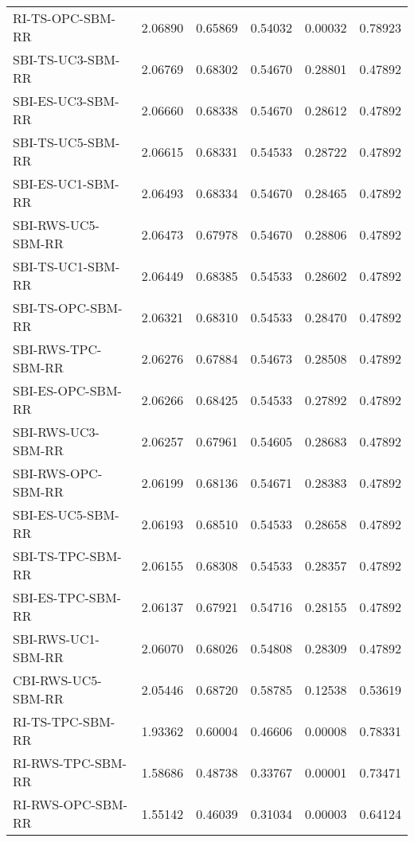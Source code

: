 \begin{tabular}{lrrrrr}
RI-TS-OPC-SBM-RR & 2.06890 & 0.65869 & 0.54032 & 0.00032 & 0.78923 \\
SBI-TS-UC3-SBM-RR & 2.06769 & 0.68302 & 0.54670 & 0.28801 & 0.47892 \\
SBI-ES-UC3-SBM-RR & 2.06660 & 0.68338 & 0.54670 & 0.28612 & 0.47892 \\
SBI-TS-UC5-SBM-RR & 2.06615 & 0.68331 & 0.54533 & 0.28722 & 0.47892 \\
SBI-ES-UC1-SBM-RR & 2.06493 & 0.68334 & 0.54670 & 0.28465 & 0.47892 \\
SBI-RWS-UC5-SBM-RR & 2.06473 & 0.67978 & 0.54670 & 0.28806 & 0.47892 \\
SBI-TS-UC1-SBM-RR & 2.06449 & 0.68385 & 0.54533 & 0.28602 & 0.47892 \\
SBI-TS-OPC-SBM-RR & 2.06321 & 0.68310 & 0.54533 & 0.28470 & 0.47892 \\
SBI-RWS-TPC-SBM-RR & 2.06276 & 0.67884 & 0.54673 & 0.28508 & 0.47892 \\
SBI-ES-OPC-SBM-RR & 2.06266 & 0.68425 & 0.54533 & 0.27892 & 0.47892 \\
SBI-RWS-UC3-SBM-RR & 2.06257 & 0.67961 & 0.54605 & 0.28683 & 0.47892 \\
SBI-RWS-OPC-SBM-RR & 2.06199 & 0.68136 & 0.54671 & 0.28383 & 0.47892 \\
SBI-ES-UC5-SBM-RR & 2.06193 & 0.68510 & 0.54533 & 0.28658 & 0.47892 \\
SBI-TS-TPC-SBM-RR & 2.06155 & 0.68308 & 0.54533 & 0.28357 & 0.47892 \\
SBI-ES-TPC-SBM-RR & 2.06137 & 0.67921 & 0.54716 & 0.28155 & 0.47892 \\
SBI-RWS-UC1-SBM-RR & 2.06070 & 0.68026 & 0.54808 & 0.28309 & 0.47892 \\
CBI-RWS-UC5-SBM-RR & 2.05446 & 0.68720 & 0.58785 & 0.12538 & 0.53619 \\
RI-TS-TPC-SBM-RR & 1.93362 & 0.60004 & 0.46606 & 0.00008 & 0.78331 \\
RI-RWS-TPC-SBM-RR & 1.58686 & 0.48738 & 0.33767 & 0.00001 & 0.73471 \\
RI-RWS-OPC-SBM-RR & 1.55142 & 0.46039 & 0.31034 & 0.00003 & 0.64124 \\
\bottomrule
\end{tabular}
